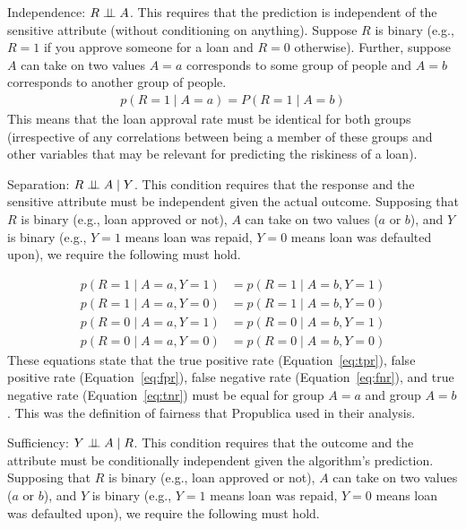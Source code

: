 \documentclass{tufte-handout}
\begin{document}
\bi
\item Independence: $R \perp\!\!\!\perp A$.  This requires that the prediction is independent of the sensitive attribute (without conditioning on anything).  Suppose $R$ is binary (e.g., $R=1$ if you approve someone for a loan and $R=0$ otherwise).  Further, suppose $A$ can take on two values $A=a$ corresponds to some group of people and $A=b$ corresponds to another group of people.
\begin{align}
p(R=1\mid A=a) = P(R=1 \mid A=b)
\end{align}
This means that the loan approval rate must be identical for both groups (irrespective of any correlations between being a member of these groups and other variables that may be relevant for predicting the riskiness of a loan).

\item Separation: $R \perp\!\!\!\perp A \mid Y$.  This condition requires that the response and the sensitive attribute must be independent given the actual outcome.  Supposing that $R$ is binary (e.g., loan approved or not), $A$ can take on two values ($a$ or $b$), and $Y$ is binary (e.g., $Y=1$ means loan was repaid, $Y=0$ means loan was defaulted upon), we require the following must hold.

\begin{align}
p(R=1 \mid A=a, Y=1) &= p(R=1 \mid A=b, Y=1) \label{eq:tpr} \\
p(R=1 \mid A=a, Y=0) &= p(R=1 \mid A=b, Y=0) \label{eq:fpr} \\
p(R=0 \mid A=a, Y=1) &= p(R=0 \mid A=b, Y=1) \label{eq:fnr} \\
p(R=0 \mid A=a, Y=0) &= p(R=0 \mid A=b, Y=0) \label{eq:tnr}
\end{align}
These equations state that the true positive rate (Equation~\ref{eq:tpr}), false positive rate (Equation~\ref{eq:fpr}), false negative rate (Equation~\ref{eq:fnr}), and true negative rate (Equation~\ref{eq:tnr}) must be equal for group $A=a$ and group $A=b$.  This was the definition of fairness that Propublica used in their analysis.

\item Sufficiency: $Y \perp\!\!\!\perp A\mid R$.  This condition requires that the outcome and the attribute must be conditionally independent given the algorithm's prediction.   Supposing that $R$ is binary (e.g., loan approved or not), $A$ can take on two values ($a$ or $b$), and $Y$ is binary (e.g., $Y=1$ means loan was repaid, $Y=0$ means loan was defaulted upon), we require the following must hold.
\end{document}
